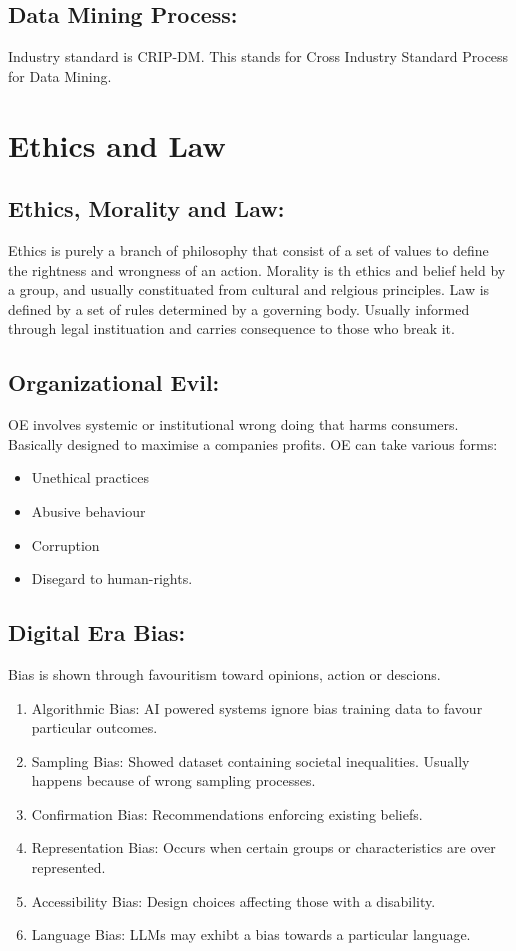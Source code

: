 \documentclass[a5paper]{article}
\begin{document}
	\subsection{Data Mining Process:}
	Industry standard is CRIP-DM. This stands for Cross Industry Standard Process for Data Mining.

	\section{Ethics and Law}
	\subsection{Ethics, Morality and Law:}
	Ethics is purely a branch of philosophy that consist of a set of values to define the rightness and wrongness of an action. Morality is th ethics and belief held by a group, and usually constituated from cultural and relgious principles. Law is defined by a set of rules determined by a governing body. Usually informed through legal instituation and carries consequence to those who break it.
	\subsection{Organizational Evil:}
	OE involves systemic or institutional wrong doing that harms consumers. Basically designed to maximise a companies profits. OE can take various forms:
	\begin{itemize}
		\item Unethical practices
		\item Abusive behaviour
		\item Corruption
		\item Disegard to human-rights.
	\end{itemize}
	\subsection{Digital Era Bias:}
	Bias is shown through favouritism toward opinions, action or descions.
	\begin{enumerate}
		\item Algorithmic Bias: AI powered systems ignore bias training data to favour particular outcomes.
		\item Sampling Bias: Showed dataset containing societal inequalities. Usually happens because of wrong sampling processes.
		\item Confirmation Bias: Recommendations enforcing existing beliefs.
		\item Representation Bias: Occurs when certain groups or characteristics are over represented.
		\item Accessibility Bias: Design choices affecting those with a disability.
		\item Language Bias: LLMs may exhibt a bias towards a particular language.
	\end{enumerate}
\end{document}
